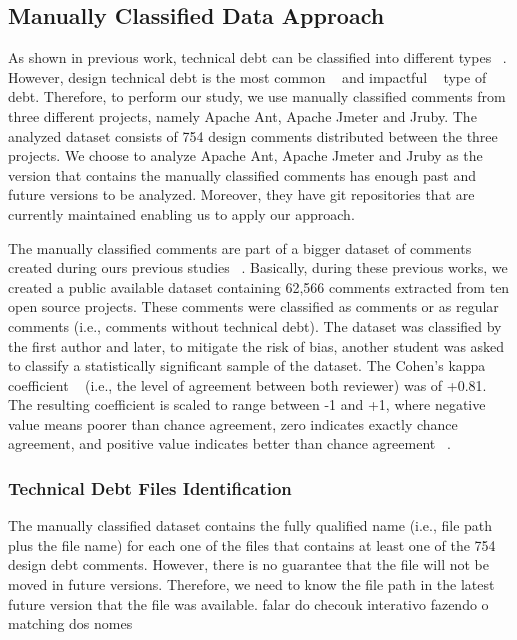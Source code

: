 \subsection*{Manually Classified Data Approach}
\label{sub:manually_classified_data_approach}

As shown in previous work, technical debt can be classified into different types ~\cite{Alves2014MTD}. However, design technical debt is the most common ~\cite{Maldonado2015MTD} and impactful ~\cite{Ernst2015FSE} type of debt. Therefore, to perform our study, we use manually classified \SATD comments from three different projects, namely Apache Ant, Apache Jmeter and Jruby. The analyzed dataset consists of 754 \SATD design comments distributed between the three projects. We choose to analyze Apache Ant, Apache Jmeter and Jruby as the version that contains the manually classified comments has enough past and future versions to be analyzed. Moreover, they have git repositories that are currently maintained enabling us to apply our approach. 

The manually classified comments are part of a bigger dataset of \SATD comments created during ours previous studies ~\cite{Maldonado2015MTD,Maldonado2015TSE}. Basically, during these previous works, we created a public available dataset containing 62,566 comments extracted from ten open source projects. These comments were classified as \SATD comments or as regular comments (i.e., comments without technical debt). The dataset was classified by the first author and later, to mitigate the risk of bias, another student was asked to classify a statistically significant sample of the dataset. The Cohen's kappa coefficient ~\cite{cohen1960coefficient} (i.e., the level of agreement between both reviewer) was of +0.81. The resulting coefficient is scaled to range between -1 and +1, where negative value means poorer than chance agreement, zero indicates exactly chance agreement, and positive value indicates better than chance agreement ~\cite{fleiss1973equivalence}.

\subsubsection*{Technical Debt Files Identification}
\label{subsub:technical_debt_files_identification}
The manually classified dataset contains the fully qualified name (i.e., file path plus the file name) for each one of the files that contains at least one of the 754 \SATD design debt comments. However, there is no guarantee that the file will not be moved in future versions. Therefore, we need to know the file path in the latest future version that the file was available. falar do checouk interativo fazendo o matching dos nomes


